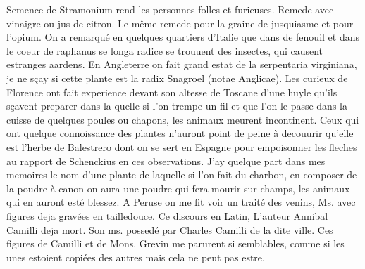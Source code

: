 \pend
\pstart Semence de Stramonium\protect{} rend les personnes folles et furieuses. Remede avec vinaigre ou jus de citron\protect{}. Le m\^{e}me remede  pour la graine de jusquiasme\protect{} et pour l'opium\protect{}. On a remarqu\'{e} en quelques quartiers d'Italie\protect{} que dans  de fenouil\protect{} et dans le coeur de raphanus\protect{} se  longa radice se trouuent des insectes, qui causent estranges aardens. En Angleterre\protect{} on fait grand estat de la serpentaria virginiana\protect{}, je ne s\c{c}ay si cette plante est la radix Snagroel\protect{} (notae Anglicae). Les curieux de Florence\protect{} ont fait experience devant son altesse de Toscane\protect{} d'une huyle qu'ils s\c{c}avent preparer dans la quelle si l'on trempe un fil et que l'on le passe dans la cuisse de quelques poules ou chapons, les animaux meurent incontinent. Ceux qui ont quelque connoissance des plantes n'auront point de peine \`{a} decouurir qu'elle est l'herbe de Balestrero\protect{} dont on se sert en Espagne\protect{} pour empoisonner les fleches au rapport de Schenckius\protect{} en ces observations. J'ay quelque part dans mes memoires le nom d'une plante de laquelle si l'on fait du charbon,  en composer de la poudre \`{a} canon on aura une poudre qui fera mourir sur  champs, les animaux qui en auront est\'{e} blessez. 
\pend 
\pstart 
A Peruse\protect{} on me fit voir un trait\'{e} des venins, Ms. avec  figures deja grav\'{e}es en tailledouce. Ce discours en Latin, L'auteur Annibal Camilli\protect{} deja mort. Son ms. possed\'{e} par Charles Camilli\protect{}  de la dite ville. Ces figures de Camilli et de Mons. Grevin\protect{} me parurent si semblables, comme si les unes estoient copi\'{e}es des autres mais cela ne peut pas estre. 
